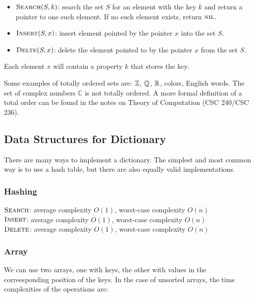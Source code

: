 \begin{itemize}
    \item $\textsc{Search}(S,k)$: search the set $S$ for an element with the key $k$ and return a pointer to one such element. If no such element exists, return $\textsc{nil}$.
    \item $\textsc{Insert}(S,x)$: insert element pointed by the pointer $x$ into the set $S$.
    \item $\textsc{Delte}(S,x)$: delete the element pointed to by the pointer $x$ from the set $S$.
\end{itemize}

Each element $x$ will contain a property $k$ that stores the key.

\begin{remark}
    Some examples of totally ordered sets are: $\mathbb{Z}$, $\mathbb{Q}$, $\mathbb{R}$, colors, English words. The set of complex numbers $\mathbb{C}$ is not totally ordered. A more formal definition of a total order can be found in the notes on Theory of Computation (CSC 240/CSC 236).
\end{remark}

\subsection{Data Structures for Dictionary}

There are many ways to implement a dictionary. The simplest and most common way is to use a hash table, but there are also equally valid implementations.

\subsubsection{Hashing}

$\textsc{Search}$: average complexity $O(1)$, worst-case complexity $O(n)$ \\
$\textsc{Insert}$: average complexity $O(1)$, worst-case complexity $O(n)$ \\
$\textsc{Delete}$: average complexity $O(1)$, worst-case complexity $O(n)$

\subsubsection{Array}

We can use two arrays, one with keys, the other with values in the correesponding position of the keys. In the case of unsorted arrays, the time complexities of the operations are:


